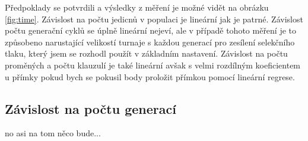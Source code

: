 \documentclass[11pt]{article}
\begin{document}
Předpoklady se potvrdili a výsledky z měření je možné vidět na obrázku \ref{fig:time}. Závislost na počtu jedicnů v populaci je lineární jak je patrné. Závislost počtu generační cyklů se úplně lineární nejeví, ale v případě tohoto měření je to způsobeno narustající velikostí turnaje s každou generací pro zesílení selekčního tlaku, který jsem se rozhodl použít v základním nastavení. Závislost na počtu proměných a počtu klauzulí je také lineární avšak s velmi rozdílným koeficientem u přímky pokud bych se pokusil body proložit přímkou pomocí lineární regrese.




\subsection{Závislost na počtu generací}
no asi na tom něco bude...
\end{document}

